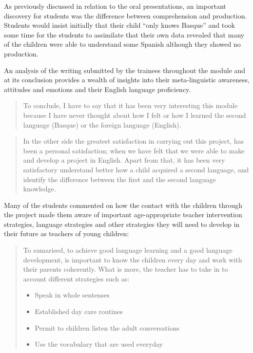 \documentclass[output=paper]{../langscibook}
\begin{document}
As previously discussed in relation to the oral presentations, an important discovery for students was the difference between comprehension and production. Students would insist initially that their child “only knows Basque” and took some time for the students to assimilate that their own data revealed that many of the children were able to understand some Spanish although they showed no production.



An analysis of the writing submitted by the trainees throughout the module and at its conclusion provides a wealth of insights into their meta-linguistic awareness, attitudes and emotions and their English language proficiency.

\begin{quote}
To conclude, I have to say that it has been very interesting this module because I have never thought about how I felt or how I learned the second language (Basque) or the foreign language (English).
\end{quote}

\begin{quote}
In the other side the greatest satisfaction in carrying out this project, has been a personal satisfaction; when we have felt that we were able to make and develop a project in English. Apart from that, it has been very satisfactory understand better how a child acquired a second language, and identify the difference between the first and the second language knowledge.
\end{quote}



Many of the students commented on how the contact with the children through the project made them aware of important age-appropriate teacher intervention strategies, language strategies and other strategies they will need to develop in their future as teachers of young children: 

\begin{quote}
To sumarised, to achieve good language learning and a good language development, is important to know the children every day and work with their parents coherently. What is more, the teacher has to take in to account different strategies such as:

\begin{itemize}
\item Speak in whole sentenses
\item Established day care routines
\item Permit to children listen the adult conversations
\item Use the vocabulary that are used everyday
\end{itemize}
\end{quote}
\end{document}
